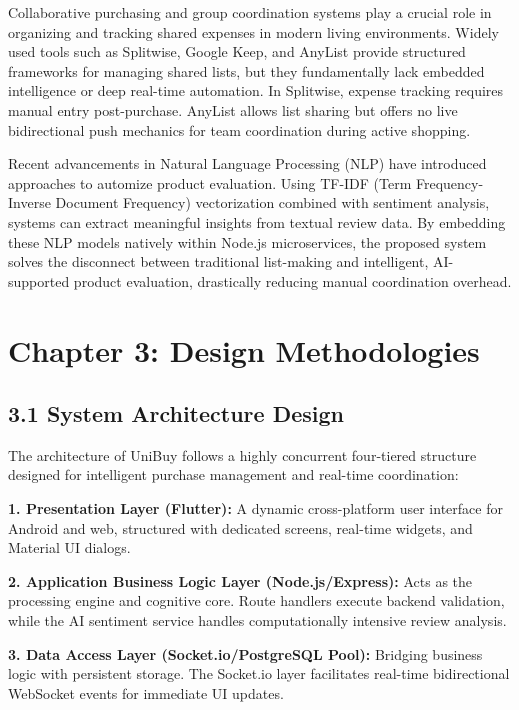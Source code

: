 \documentclass[a4paper,12pt]{article}
\begin{document}
Collaborative purchasing and group coordination systems play a crucial role in organizing and tracking shared expenses in modern living environments. Widely used tools such as Splitwise, Google Keep, and AnyList provide structured frameworks for managing shared lists, but they fundamentally lack embedded intelligence or deep real-time automation. In Splitwise, expense tracking requires manual entry post-purchase. AnyList allows list sharing but offers no live bidirectional push mechanics for team coordination during active shopping.

Recent advancements in Natural Language Processing (NLP) have introduced approaches to automize product evaluation. Using TF-IDF (Term Frequency-Inverse Document Frequency) vectorization combined with sentiment analysis, systems can extract meaningful insights from textual review data. By embedding these NLP models natively within Node.js microservices, the proposed system solves the disconnect between traditional list-making and intelligent, AI-supported product evaluation, drastically reducing manual coordination overhead.

\newpage
\section*{Chapter 3: Design Methodologies}

\subsection*{3.1 System Architecture Design}
The architecture of UniBuy follows a highly concurrent four-tiered structure designed for intelligent purchase management and real-time coordination:

\textbf{1. Presentation Layer (Flutter):} A dynamic cross-platform user interface for Android and web, structured with dedicated screens, real-time widgets, and Material UI dialogs.

\textbf{2. Application Business Logic Layer (Node.js/Express):} Acts as the processing engine and cognitive core. Route handlers execute backend validation, while the AI sentiment service handles computationally intensive review analysis.

\textbf{3. Data Access Layer (Socket.io/PostgreSQL Pool):} Bridging business logic with persistent storage. The Socket.io layer facilitates real-time bidirectional WebSocket events for immediate UI updates.
\end{document}
